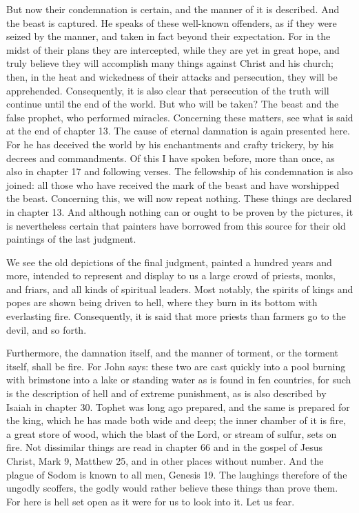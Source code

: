 But now their condemnation is certain, and the manner of it is described. And the beast is captured. He speaks of these well-known offenders, as if they were seized by the manner, and taken in fact beyond their expectation. For in the midst of their plans they are intercepted, while they are yet in great hope, and truly believe they will accomplish many things against Christ and his church; then, in the heat and wickedness of their attacks and persecution, they will be apprehended. Consequently, it is also clear that persecution of the truth will continue until the end of the world. But who will be taken? The beast and the false prophet, who performed miracles. Concerning these matters, see what is said at the end of chapter 13. The cause of eternal damnation is again presented here. For he has deceived the world by his enchantments and crafty trickery, by his decrees and commandments. Of this I have spoken before, more than once, as also in chapter 17 and following verses. The fellowship of his condemnation is also joined: all those who have received the mark of the beast and have worshipped the beast. Concerning this, we will now repeat nothing. These things are declared in chapter 13. And although nothing can or ought to be proven by the pictures, it is nevertheless certain that painters have borrowed from this source for their old paintings of the last judgment.

We see the old depictions of the final judgment, painted a hundred years and more, intended to represent and display to us a large crowd of priests, monks, and friars, and all kinds of spiritual leaders. Most notably, the spirits of kings and popes are shown being driven to hell, where they burn in its bottom with everlasting fire. Consequently, it is said that more priests than farmers go to the devil, and so forth.

Furthermore, the damnation itself, and the manner of torment, or the torment itself, shall be fire. For John says: these two are cast quickly into a pool burning with brimstone into a lake or standing water as is found in fen countries, for such is the description of hell and of extreme punishment, as is also described by Isaiah in chapter 30. Tophet was long ago prepared, and the same is prepared for the king, which he has made both wide and deep; the inner chamber of it is fire, a great store of wood, which the blast of the Lord, or stream of sulfur, sets on fire. Not dissimilar things are read in chapter 66 and in the gospel of Jesus Christ, Mark 9, Matthew 25, and in other places without number. And the plague of Sodom is known to all men, Genesis 19. The laughings therefore of the ungodly scoffers, the godly would rather believe these things than prove them. For here is hell set open as it were for us to look into it. Let us fear.

